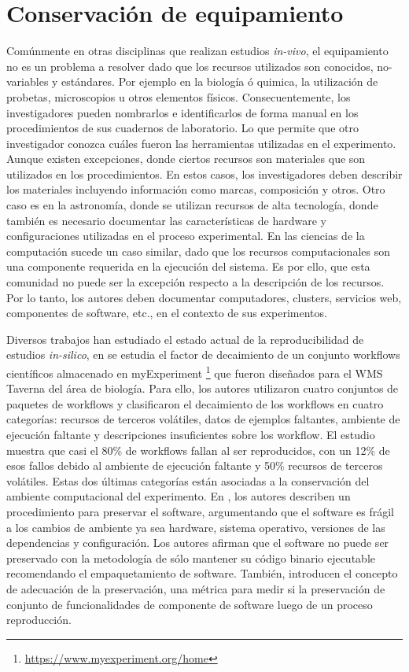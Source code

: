 \section{Conservación de equipamiento}
Comúnmente en otras disciplinas que realizan estudios \emph{in-vivo}, el equipamiento no es un problema a resolver dado que los recursos utilizados son conocidos, no-variables y estándares. Por ejemplo en la biología ó quimica, la utilización de probetas, microscopios u otros elementos físicos. 
Consecuentemente, los investigadores pueden nombrarlos e identificarlos de forma manual en los procedimientos de sus cuadernos de laboratorio. Lo que permite que otro investigador conozca cuáles fueron las herramientas utilizadas en el experimento.
Aunque existen excepciones, donde ciertos recursos son materiales que son utilizados en los procedimientos. En estos casos, los investigadores deben describir los materiales incluyendo información como marcas, composición y otros. 
Otro caso es en la astronomía, donde se utilizan recursos de alta tecnología, donde también es necesario documentar las características de hardware y configuraciones utilizadas en el proceso experimental. 
En las ciencias de la computación sucede un caso similar, dado que los recursos computacionales son una componente requerida en la ejecución del sistema. 
Es por ello, que esta comunidad no puede ser la excepción respecto a la descripción de los recursos. Por lo tanto, los autores deben documentar computadores, clusters, servicios web, componentes de software, etc., en el contexto de sus experimentos.

Diversos trabajos han estudiado el estado actual de la reproducibilidad de estudios \emph{in-silico}, en \cite{DBLP:conf/eScience/ZhaoGBKGGHRRG12} se estudia el factor de decaimiento de un conjunto workflows científicos almacenado en myExperiment \footnote{\url{https://www.myexperiment.org/home}} que fueron diseñados para el WMS Taverna \cite{DBLP:journals/bioinformatics/OinnAFMSGCGPWL04} del área de biología. Para ello, los autores utilizaron cuatro conjuntos de paquetes de workflows y clasificaron el decaimiento de los workflows en cuatro categorías: recursos de terceros volátiles, datos de ejemplos faltantes, ambiente de ejecución faltante y descripciones insuficientes sobre los workflow. El estudio muestra que casi el 80\% de workflows fallan al ser reproducidos, con un 12\% de esos fallos debido al ambiente de ejecución faltante y 50\% recursos de terceros volátiles. Estas dos últimas categorías están asociadas a la conservación del ambiente computacional del experimento.
En \cite{DBLP:conf/ipres/MatthewsCWJBS09}, los autores describen un procedimiento para preservar el software, argumentando que el software es frágil a los cambios de ambiente ya sea hardware, sistema operativo, versiones de las dependencias y configuración. Los autores afirman que el software no puede ser preservado con la metodología de sólo mantener su código binario ejecutable recomendando el empaquetamiento de software. También, introducen el concepto de adecuación de la preservación, una métrica para medir si la preservación de conjunto de funcionalidades de componente de software luego de un proceso reproducción.

